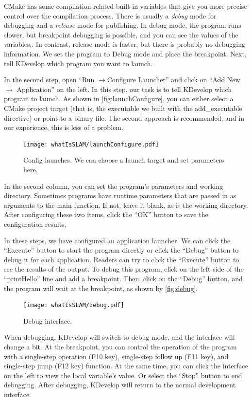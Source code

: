 CMake has some compilation-related built-in variables that give you more precise control over the compilation process. There is usually a \textit{debug} mode for debugging and a \textit{release} mode for publishing. In debug mode, the program runs slower, but breakpoint debugging is possible, and you can see the values of the variables;. In contrast, release mode is faster, but there is probably no debugging information. We set the program to Debug mode and place the breakpoint. Next, tell KDevelop which program you want to launch.

In the second step, open ``Run $\rightarrow$Configure Launcher'' and click on ``Add New $\rightarrow$ Application'' on the left. In this step, our task is to tell KDevelop which program to launch. As shown in \autoref{fig:launchConfigure}, you can either select a CMake project target (that is, the executable we built with the add\_executable directive) or point to a binary file. The second approach is recommended, and in our experience, this is less of a problem.

\begin{figure}[!ht]
    \centering
    \texttt{[image: whatIsSLAM/launchConfigure.pdf]}
    \caption{Config launches. We can choose a launch target and set parameters here. }
    \label{fig:launchConfigure}
\end{figure}

In the second column, you can set the program's parameters and working directory. Sometimes programs have runtime parameters that are passed in as arguments to the main function. If not, leave it blank, as is the working directory. After configuring these two items, click the ``OK'' button to save the configuration results.

In these steps, we have configured an application launcher. We can click the ``Execute'' button to start the program directly or click the ``Debug'' button to debug it for each application. Readers can try to click the ``Execute'' button to see the results of the output. To debug this program, click on the left side of the ``printHello'' line and add a breakpoint. Then, click on the ``Debug'' button, and the program will wait at the breakpoint, as shown by \autoref{fig:debug}.

\begin{figure}[!htp]
    \centering
    \texttt{[image: whatIsSLAM/debug.pdf]}
    \caption{Debug interface. }
    \label{fig:debug}
\end{figure}

When debugging, KDevelop will switch to debug mode, and the interface will change a bit. At the breakpoint, you can control the operation of the program with a single-step operation (F10 key), single-step follow up (F11 key), and single-step jump (F12 key) function. At the same time, you can click the interface on the left to view the local variable's value. Or select the ``Stop'' button to end debugging. After debugging, KDevelop will return to the normal development interface.

